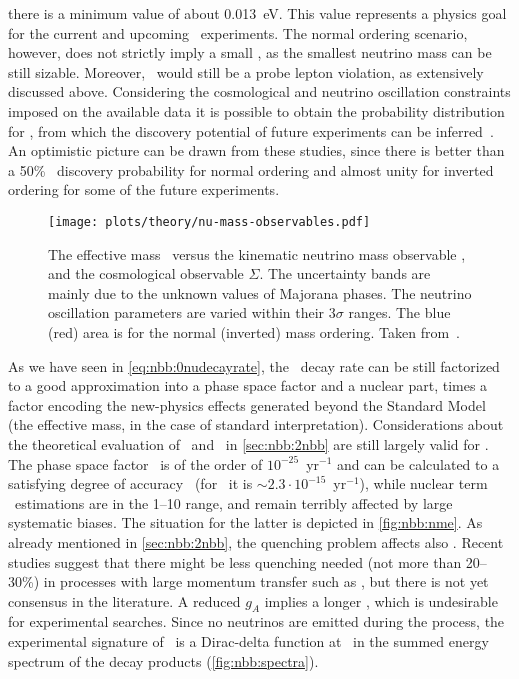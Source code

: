 there is a minimum value of about 0.013~eV. This value represents a physics goal for the
current and upcoming \onbb\ experiments. The normal ordering scenario, however, does not
strictly imply a small \mbb, as the smallest neutrino mass can be still sizable. Moreover,
\onbb\ would still be a probe lepton violation, as extensively discussed above.
\newpar
Considering the cosmological and neutrino oscillation constraints imposed on the available
data it is possible to obtain the probability distribution for \mbb, from which the
discovery potential of future experiments can be inferred~\cite{Caldwell2017,
Agostini2017a, Ge2017}. An optimistic picture can be drawn from these studies, since there
is better than a 50\% \onbb\ discovery probability for normal ordering and almost unity
for inverted ordering for some of the future experiments.

\begin{figure}
  \centering
  \texttt{[image: plots/theory/nu-mass-observables.pdf]}
  \caption{%
    The effective mass \mbb\ versus the kinematic neutrino mass observable \mb, and the
    cosmological observable $\Sigma$. The uncertainty bands are mainly due to the unknown
    values of Majorana phases. The neutrino oscillation parameters are varied within their
    $3\sigma$ ranges. The blue (red) area is for the normal (inverted) mass ordering.
    Taken from~\cite{Dolinski2019}.
  }\label{fig:nbb:mass-obs}
\end{figure}

As we have seen in \cref{eq:nbb:0nudecayrate}, the \onbb\ decay rate can be still
factorized to a good approximation into a phase space factor and a nuclear part, times a
factor encoding the new-physics effects generated beyond the Standard Model (the effective
mass, in the case of standard interpretation). Considerations about the theoretical
evaluation of \psft\ and \nmet\ in \cref{sec:nbb:2nbb} are still largely valid for \onbb.
The phase space factor \psfz\ is of the order of $10^{-25}$~yr$^{-1}$ and can be
calculated to a satisfying degree of accuracy~\cite{Kotila2012, Stoica2013} (for \gesix\
it is ${\sim}2.3 \cdot 10^{-15}$~yr$^{-1}$), while nuclear term \nmez\ estimations are in
the 1--10 range, and remain terribly affected by large systematic biases. The situation
for the latter is depicted in \cref{fig:nbb:nme}. As already mentioned in
\cref{sec:nbb:2nbb}, the quenching problem affects also \onbb. Recent studies suggest that
there might be less quenching needed (not more than 20--30\%) in processes with large
momentum transfer such as \onbb, but there is not yet consensus in the literature. A
reduced $g_A$ implies a longer \thalfzero, which is undesirable for experimental searches.
Since no neutrinos are emitted during the process, the experimental signature of \onbb\ is
a Dirac-delta function at \qbb\ in the summed energy spectrum of the decay products
(\cref{fig:nbb:spectra}).

